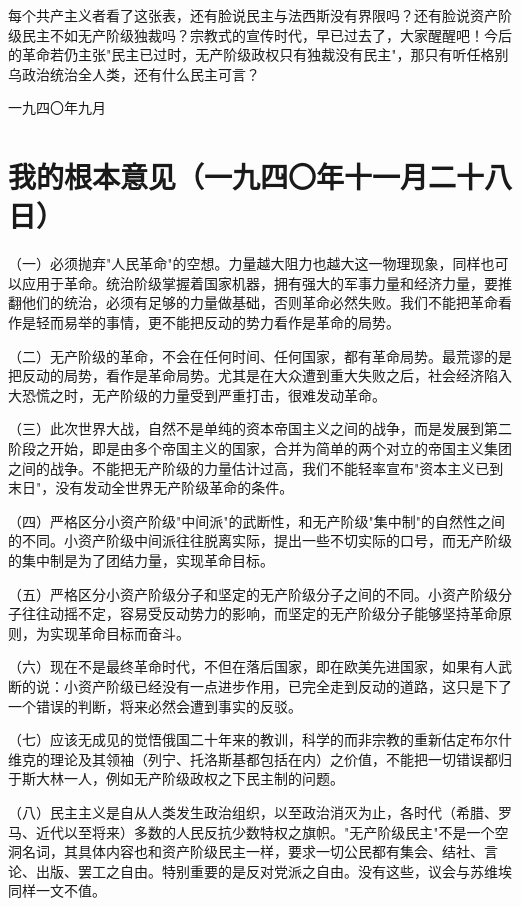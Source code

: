 \documentclass[
  openany,           %
  12pt,              %
  a4paper            %
]{ctexbook}
\begin{document}
每个共产主义者看了这张表，还有脸说民主与法西斯没有界限吗？还有脸说资产阶级民主不如无产阶级独裁吗？宗教式的宣传时代，早已过去了，大家醒醒吧！今后的革命若仍主张"民主已过时，无产阶级政权只有独裁没有民主"，那只有听任格别乌政治统治全人类，还有什么民主可言？

\hfill 一九四〇年九月

\chapter{我的根本意见（一九四〇年十一月二十八日）}

\quad\quad （一）必须抛弃"人民革命"的空想。力量越大阻力也越大这一物理现象，同样也可以应用于革命。统治阶级掌握着国家机器，拥有强大的军事力量和经济力量，要推翻他们的统治，必须有足够的力量做基础，否则革命必然失败。我们不能把革命看作是轻而易举的事情，更不能把反动的势力看作是革命的局势。

（二）无产阶级的革命，不会在任何时间、任何国家，都有革命局势。最荒谬的是把反动的局势，看作是革命局势。尤其是在大众遭到重大失败之后，社会经济陷入大恐慌之时，无产阶级的力量受到严重打击，很难发动革命。

（三）此次世界大战，自然不是单纯的资本帝国主义之间的战争，而是发展到第二阶段之开始，即是由多个帝国主义的国家，合并为简单的两个对立的帝国主义集团之间的战争。不能把无产阶级的力量估计过高，我们不能轻率宣布"资本主义已到末日"，没有发动全世界无产阶级革命的条件。

（四）严格区分小资产阶级"中间派"的武断性，和无产阶级"集中制"的自然性之间的不同。小资产阶级中间派往往脱离实际，提出一些不切实际的口号，而无产阶级的集中制是为了团结力量，实现革命目标。

（五）严格区分小资产阶级分子和坚定的无产阶级分子之间的不同。小资产阶级分子往往动摇不定，容易受反动势力的影响，而坚定的无产阶级分子能够坚持革命原则，为实现革命目标而奋斗。

（六）现在不是最终革命时代，不但在落后国家，即在欧美先进国家，如果有人武断的说：小资产阶级已经没有一点进步作用，已完全走到反动的道路，这只是下了一个错误的判断，将来必然会遭到事实的反驳。

（七）应该无成见的觉悟俄国二十年来的教训，科学的而非宗教的重新估定布尔什维克的理论及其领袖（列宁、托洛斯基都包括在内）之价值，不能把一切错误都归于斯大林一人，例如无产阶级政权之下民主制的问题。

（八）民主主义是自从人类发生政治组织，以至政治消灭为止，各时代（希腊、罗马、近代以至将来）多数的人民反抗少数特权之旗帜。"无产阶级民主"不是一个空洞名词，其具体内容也和资产阶级民主一样，要求一切公民都有集会、结社、言论、出版、罢工之自由。特别重要的是反对党派之自由。没有这些，议会与苏维埃同样一文不值。
\end{document}

